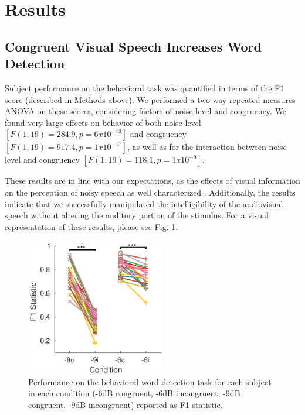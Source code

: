 \documentclass[10pt,letterpaper]{article}
\begin{document}


\section{Results}

\subsection{Congruent Visual Speech Increases Word Detection}

  Subject performance on the behavioral task was quantified in terms of the 
  F1 score (described in Methods above). We performed a two-way repeated 
  measures ANOVA on these scores, considering factors of noise level and 
  congruency. We found very large effects on behavior of both noise level 
  $[F(1,19) = 284.9, p = 6 x 10^{-13}]$ and congruency
  $[F(1, 19) = 917.4, p = 1 x 10^{-17}]$, as well as for the interaction 
  between noise level and congruency $[F(1, 19) = 118.1, p = 1 x 10^{-9}]$.

  These results are in line with our expectations, as the effects of visual 
  information on the perception of noisy speech as well characterized 
  \cite{Ross2007}. Additionally, the results indicate that we successfully 
  manipulated the intelligibility of the audiovisual speech without 
  altering the auditory portion of the stimulus.
  For a visual representation of these results, please see Fig. \ref{behavior}.

  \begin{figure}[h]
    \begin{center}
      \includegraphics[width=0.7\columnwidth,height=6cm]{Figure2c}
    \end{center}
    \caption{Performance on the behavioral word detection
    task for each subject in each condition (-6dB congruent, 
    -6dB incongruent, -9dB congruent, -9dB incongruent) 
    reported as F1 statistic.}
    \label{behavior}
  \end{figure}
\end{document}

